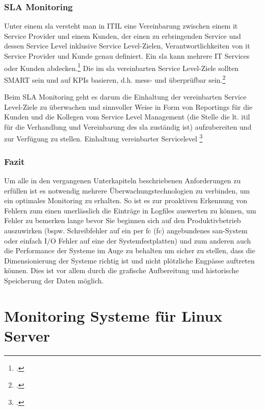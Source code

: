 \documentclass[12pt,a4paper,parskip,listof=totoc,bibliography=totoc]{scrreprt}
\begin{document}
	\subsection{SLA Monitoring}
	Unter einem \acrfull{sla} versteht man in ITIL eine \glqq Vereinbarung zwischen einem \acrshort{it} Service Provider und einem Kunden, der einen zu erbringenden Service und dessen Service Level inklusive Service Level-Zielen, Verantwortlichkeiten von \acrshort{it} Service Provider und Kunde genau definiert. Ein \acrshort{sla} kann mehrere IT Services oder Kunden abdecken.\grqq \footcite[S. 732; Stichwort: Service Level Agreement]{ebelitilv3} Die im \acrshort{sla} vereinbarten Service Level-Ziele sollten SMART sein und auf KPIs basieren, d.h. mess- und überprüfbar sein.\footcite[S. 733; Stichwort: Service Level-Ziele]{ebelitilv3}
	
	Beim SLA Monitoring geht es darum die Einhaltung der vereinbarten Service Level-Ziele zu überwachen und sinnvoller Weise in Form von Reportings für die Kunden und die Kollegen vom Service Level Management (die Stelle die lt. \acrshort{itil} für die Verhandlung und Vereinbarung des \acrshort{sla} zuständig ist) aufzubereiten und zur Verfügung zu stellen.
	Einhaltung vereinbarter Servicelevel \footcite[40]{iso20000sla}
	\subsection{Fazit}
	Um alle in den vergangenen Unterkapiteln beschriebenen Anforderungen zu erfüllen ist es notwendig mehrere Überwachungstechnologien zu verbinden, um ein optimales Monitoring zu erhalten. So ist es zur proaktiven Erkennung von Fehlern zum einen unerlässlich die Einträge in Logfiles auswerten zu können, um Fehler zu bemerken lange bevor Sie beginnen sich auf den Produktivbetrieb auszuwirken (bspw. Schreibfehler auf ein per \acrlong{fc} (\acrshort{fc}) angebundenes \acrshort{san}-System oder einfach I/O Fehler auf eine der Systemfestplatten) und zum anderen auch die Performance der Systeme im Auge zu behalten um sicher zu stellen, dass die Dimensionierung der Systeme richtig ist und nicht plötzliche Engpässe auftreten können. Dies ist vor allem durch die grafische Aufbereitung und historische Speicherung der Daten möglich. 
	\chapter{Monitoring Systeme für Linux Server}
\end{document}
